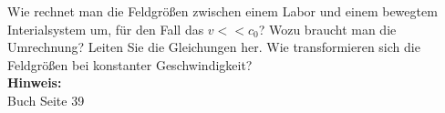 \begin{question}[section=2,subsection=22,name={Bewegtes System},difficulty=4,type=mdl,mode=exm,tags={}]
	Wie rechnet man die Feldgrößen zwischen einem Labor und einem bewegtem Interialsystem um, für den Fall das $v << c_0$? Wozu braucht man die Umrechnung? Leiten Sie die Gleichungen her. Wie transformieren sich die Feldgrößen bei konstanter Geschwindigkeit?
	\\ \textbf{Hinweis:}\\
	Buch Seite 39
\end{question}
\begin{solution}
	
\end{solution}